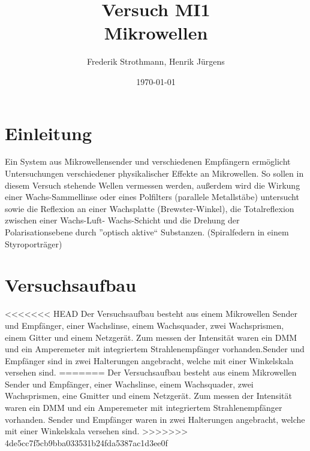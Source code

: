 \documentclass[12pt]{scrartcl}
\title{Versuch MI1\\ Mikrowellen}
\author{Frederik Strothmann, Henrik Jürgens}
\date{\today}
\begin{document}

\maketitle
\tableofcontents
\newpage


\section{Einleitung}

Ein System aus Mikrowellensender und verschiedenen Empfängern ermöglicht Untersuchungen verschiedener physikalischer Effekte an Mikrowellen. So sollen in diesem Versuch stehende Wellen vermessen werden, außerdem wird die Wirkung einer Wachs-Sammellinse oder eines Polfilters (parallele Metallstäbe) untersucht sowie die Reflexion
an einer Wachsplatte (Brewster-Winkel), die Totalreflexion zwischen einer Wachs-Luft-
Wachs-Schicht und die Drehung der Polarisationsebene durch
”optisch aktive“ Substanzen.
(Spiralfedern in einem Styroporträger)

\section{Versuchsaufbau}
<<<<<<< HEAD
Der Versuchsaufbau besteht aus einem Mikrowellen Sender und Empfänger, einer Wachslinse, einem Wachsquader, zwei Wachsprismen, einem Gitter und einem Netzgerät. Zum messen der Intensität waren ein DMM und ein Amperemeter mit integriertem Strahlenempfänger vorhanden.Sender und Empfänger sind in zwei Halterungen angebracht, welche mit einer Winkelskala versehen sind.
=======
Der Versuchsaufbau besteht aus einem Mikrowellen Sender und Empfänger, einer Wachslinse, einem Wachsquader, zwei Wachsprismen, eine Gmitter und einem Netzgerät. Zum messen der Intensität waren ein DMM und ein Amperemeter mit integriertem Strahlenempfänger vorhanden. Sender und Empfänger waren in zwei Halterungen angebracht, welche mit einer Winkelskala versehen sind.
>>>>>>> 4de5cc7f5cb9bba033531b24fda5387ac1d3ee0f
\end{document}
